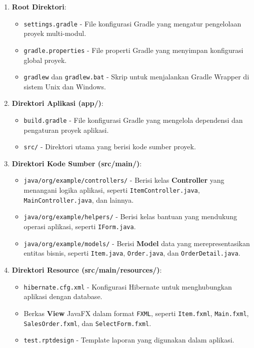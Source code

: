 \begin{enumerate}
	\item \textbf{Root Direktori}:
	\begin{itemize}
		\item \texttt{settings.gradle} - File konfigurasi Gradle yang mengatur pengelolaan proyek multi-modul.
		\item \texttt{gradle.properties} - File properti Gradle yang menyimpan konfigurasi global proyek.
		\item \texttt{gradlew} dan \texttt{gradlew.bat} - Skrip untuk menjalankan Gradle Wrapper di sistem Unix dan Windows.
	\end{itemize}
	
	\item \textbf{Direktori Aplikasi (app/)}:
	\begin{itemize}
		\item \texttt{build.gradle} - File konfigurasi Gradle yang mengelola dependensi dan pengaturan proyek aplikasi.
		\item \texttt{src/} - Direktori utama yang berisi kode sumber proyek.
	\end{itemize}
	
	\item \textbf{Direktori Kode Sumber (src/main/)}:
	\begin{itemize}
		\item \texttt{java/org/example/controllers/} - Berisi kelas \textbf{Controller} yang menangani logika aplikasi, seperti \texttt{ItemController.java}, \texttt{MainController.java}, dan lainnya.
		\item \texttt{java/org/example/helpers/} - Berisi kelas bantuan yang mendukung operasi aplikasi, seperti \texttt{IForm.java}.
		\item \texttt{java/org/example/models/} - Berisi \textbf{Model} data yang merepresentasikan entitas bisnis, seperti \texttt{Item.java}, \texttt{Order.java}, dan \texttt{OrderDetail.java}.
	\end{itemize}
	
	\item \textbf{Direktori Resource (src/main/resources/)}:
	\begin{itemize}
		\item \texttt{hibernate.cfg.xml} - Konfigurasi Hibernate untuk menghubungkan aplikasi dengan database.
		\item Berkas \textbf{View} JavaFX dalam format \texttt{FXML}, seperti \texttt{Item.fxml}, \texttt{Main.fxml}, \texttt{SalesOrder.fxml}, dan \texttt{SelectForm.fxml}.
		\item \texttt{test.rptdesign} - Template laporan yang digunakan dalam aplikasi.
	\end{itemize}
\end{enumerate}


